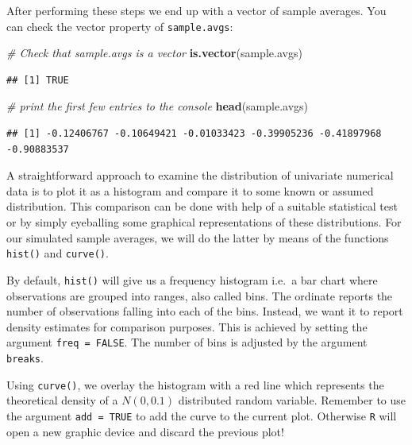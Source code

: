\documentclass[]{book}
\newenvironment{Shaded}{\begin{snugshade}}{\end{snugshade}}
\newcommand{\KeywordTok}[1]{\textcolor[rgb]{0.13,0.29,0.53}{\textbf{#1}}}
\newcommand{\CommentTok}[1]{\textcolor[rgb]{0.56,0.35,0.01}{\textit{#1}}}
\newcommand{\NormalTok}[1]{#1}
\theoremstyle{definition}
\theoremstyle{definition}
\theoremstyle{definition}
\theoremstyle{remark}
\begin{document}
After performing these steps we end up with a vector of sample averages.
You can check the vector property of \texttt{sample.avgs}:

\begin{Shaded}
\begin{Highlighting}[]
\CommentTok{# Check that sample.avgs is a vector}
\KeywordTok{is.vector}\NormalTok{(sample.avgs) }
\end{Highlighting}
\end{Shaded}

\begin{verbatim}
## [1] TRUE
\end{verbatim}

\begin{Shaded}
\begin{Highlighting}[]
\CommentTok{# print the first few entries to the console}
\KeywordTok{head}\NormalTok{(sample.avgs)}
\end{Highlighting}
\end{Shaded}

\begin{verbatim}
## [1] -0.12406767 -0.10649421 -0.01033423 -0.39905236 -0.41897968 -0.90883537
\end{verbatim}

A straightforward approach to examine the distribution of univariate
numerical data is to plot it as a histogram and compare it to some known
or assumed distribution. This comparison can be done with help of a
suitable statistical test or by simply eyeballing some graphical
representations of these distributions. For our simulated sample
averages, we will do the latter by means of the functions
\texttt{hist()} and \texttt{curve()}.

By default, \texttt{hist()} will give us a frequency histogram i.e.~a
bar chart where observations are grouped into ranges, also called bins.
The ordinate reports the number of observations falling into each of the
bins. Instead, we want it to report density estimates for comparison
purposes. This is achieved by setting the argument
\texttt{freq = FALSE}. The number of bins is adjusted by the argument
\texttt{breaks}.

Using \texttt{curve()}, we overlay the histogram with a red line which
represents the theoretical density of a \(N(0, 0.1)\) distributed random
variable. Remember to use the argument \texttt{add = TRUE} to add the
curve to the current plot. Otherwise \texttt{R} will open a new graphic
device and discard the previous plot!
\end{document}
